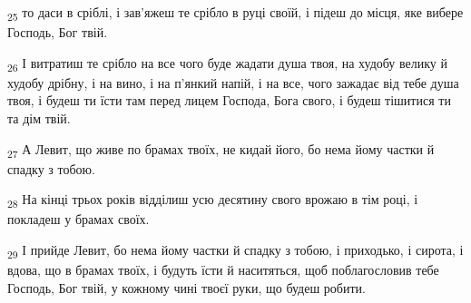 \begin{tcolorbox}
\textsubscript{25} то даси в сріблі, і зав'яжеш те срібло в руці своїй, і підеш до місця, яке вибере Господь, Бог твій.
\end{tcolorbox}
\begin{tcolorbox}
\textsubscript{26} І витратиш те срібло на все чого буде жадати душа твоя, на худобу велику й худобу дрібну, і на вино, і на п'янкий напій, і на все, чого зажадає від тебе душа твоя, і будеш ти їсти там перед лицем Господа, Бога свого, і будеш тішитися ти та дім твій.
\end{tcolorbox}
\begin{tcolorbox}
\textsubscript{27} А Левит, що живе по брамах твоїх, не кидай його, бо нема йому частки й спадку з тобою.
\end{tcolorbox}
\begin{tcolorbox}
\textsubscript{28} На кінці трьох років відділиш усю десятину свого врожаю в тім році, і покладеш у брамах своїх.
\end{tcolorbox}
\begin{tcolorbox}
\textsubscript{29} І прийде Левит, бо нема йому частки й спадку з тобою, і приходько, і сирота, і вдова, що в брамах твоїх, і будуть їсти й наситяться, щоб поблагословив тебе Господь, Бог твій, у кожному чині твоєї руки, що будеш робити.
\end{tcolorbox}
